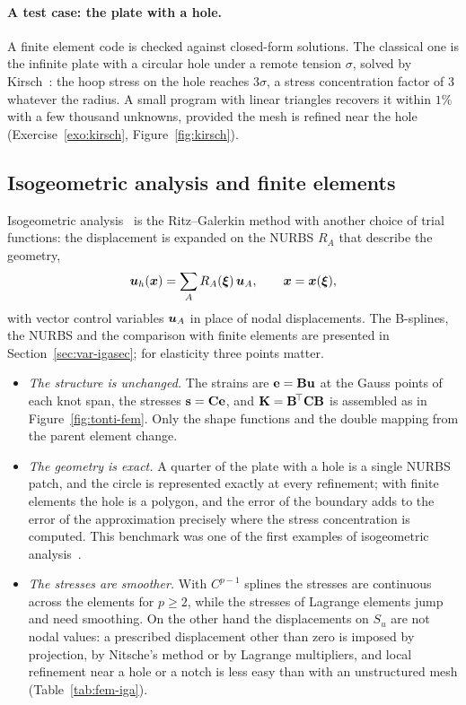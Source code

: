 \paragraph{A test case: the plate with a hole.} A finite element code is
%
checked against closed-form solutions. The classical one is the infinite
plate with a circular hole under a remote tension $\sigma$, solved by
Kirsch~\cite{Kirsch1898}: the hoop stress on the hole reaches $3\sigma$, a
stress concentration factor of $3$ whatever the radius. A small program with
linear triangles recovers it within $1\%$ with a few thousand unknowns,
provided the mesh is refined near the hole (Exercise~\ref{exo:kirsch},
Figure~\ref{fig:kirsch}).

\subsection{Isogeometric analysis and finite elements}\label{sec:el-iga}
%
Isogeometric analysis~\cite{HughesCottrellBazilevs2005,CottrellHughesBazilevs2009}
is the Ritz--Galerkin method with another choice of trial functions: the
displacement is expanded on the NURBS $R_A$ that describe the geometry,
\[
  \bm{u}_h(\bm{x})=\sum_AR_A(\bm{\xi})\,\bm{u}_A,\qquad \bm{x}=\bm{x}(\bm{\xi}),
\]
with vector control variables $\bm{u}_A$ in place of nodal displacements. The
B-splines, the NURBS and the comparison with finite elements are presented
in Section~\ref{sec:var-igasec}; for elasticity three points matter.
\begin{itemize}
\item \emph{The structure is unchanged.} The strains are $\mathbf{e}=\mathbf{B}\mathbf{u}$
at the Gauss points of each knot span, the stresses $\mathbf{s}=\mathbf{C}\mathbf{e}$,
and $\mathbf{K}=\mathbf{B}^{\!\top}\mathbf{C}\mathbf{B}$ is assembled as in
Figure~\ref{fig:tonti-fem}. Only the shape functions and the double mapping
from the parent element change.
\item \emph{The geometry is exact.} A quarter of the plate with a hole is a
single NURBS patch, and the circle is represented exactly at every
refinement; with finite elements the hole is a polygon, and the error of the
boundary adds to the error of the approximation precisely where the stress
concentration is computed. This benchmark was one of the first examples of
isogeometric analysis~\cite{HughesCottrellBazilevs2005}.
\item \emph{The stresses are smoother.} With $C^{p-1}$ splines the stresses
are continuous across the elements for $p\ge2$, while the stresses of
Lagrange elements jump and need smoothing. On the other hand the displacements
on $S_u$ are not nodal values: a prescribed displacement other than zero is
imposed by projection, by Nitsche's method or by Lagrange multipliers, and
local refinement near a hole or a notch is less easy than with an
unstructured mesh (Table~\ref{tab:fem-iga}).
\end{itemize}

